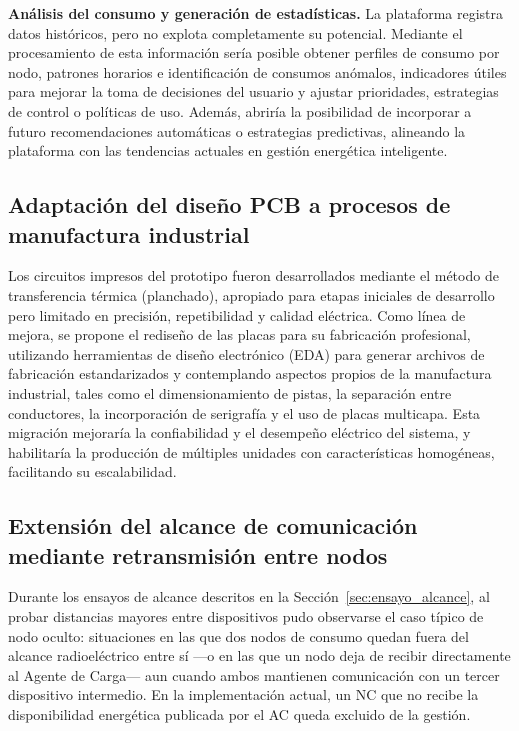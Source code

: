 \textbf{Análisis del consumo y generación de estadísticas.} La plataforma registra datos históricos, pero no explota completamente su potencial. Mediante el procesamiento de esta información sería posible obtener perfiles de consumo por nodo, patrones horarios e identificación de consumos anómalos, indicadores útiles para mejorar la toma de decisiones del usuario y ajustar prioridades, estrategias de control o políticas de uso. Además, abriría la posibilidad de incorporar a futuro recomendaciones automáticas o estrategias predictivas, alineando la plataforma con las tendencias actuales en gestión energética inteligente.

\subsection{Adaptación del diseño PCB a procesos de manufactura industrial}

Los circuitos impresos del prototipo fueron desarrollados mediante el método de transferencia térmica (planchado), apropiado para etapas iniciales de desarrollo pero limitado en precisión, repetibilidad y calidad eléctrica. Como línea de mejora, se propone el rediseño de las placas para su fabricación profesional, utilizando herramientas de diseño electrónico (EDA) para generar archivos de fabricación estandarizados y contemplando aspectos propios de la manufactura industrial, tales como el dimensionamiento de pistas, la separación entre conductores, la incorporación de serigrafía y el uso de placas multicapa. Esta migración mejoraría la confiabilidad y el desempeño eléctrico del sistema, y habilitaría la producción de múltiples unidades con características homogéneas, facilitando su escalabilidad.

\subsection{Extensión del alcance de comunicación mediante retransmisión entre nodos}
\label{sec:tf_alcance}

Durante los ensayos de alcance descritos en la Sección~\ref{sec:ensayo_alcance}, al probar distancias mayores entre dispositivos pudo observarse el caso típico de nodo oculto: situaciones en las que dos nodos de consumo quedan fuera del alcance radioeléctrico entre sí ---o en las que un nodo deja de recibir directamente al Agente de Carga--- aun cuando ambos mantienen comunicación con un tercer dispositivo intermedio. En la implementación actual, un NC que no recibe la disponibilidad energética publicada por el AC queda excluido de la gestión.

